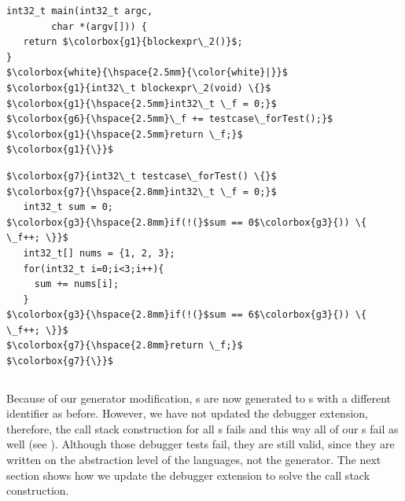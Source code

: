 \noindent
\begin{minipage}{0.50\columnwidth}
\begin{lstlisting}[language=reducedMbeddr]
int32_t main(int32_t argc,
		char *(argv[])) {
   return $\colorbox{g1}{blockexpr\_2()}$;
}  
$\colorbox{white}{\hspace{2.5mm}{\color{white}|}}$
$\colorbox{g1}{int32\_t blockexpr\_2(void) \{}$
$\colorbox{g1}{\hspace{2.5mm}int32\_t \_f = 0;}$
$\colorbox{g6}{\hspace{2.5mm}\_f += testcase\_forTest();}$
$\colorbox{g1}{\hspace{2.5mm}return \_f;}$
$\colorbox{g1}{\}}$
\end{lstlisting}  
\end{minipage}
\begin{minipage}{0.5\columnwidth}
\begin{lstlisting}[language=reducedMbeddr]
$\colorbox{g7}{int32\_t testcase\_forTest() \{}$
$\colorbox{g7}{\hspace{2.8mm}int32\_t \_f = 0;}$
   int32_t sum = 0;
$\colorbox{g3}{\hspace{2.8mm}if(!(}$sum == 0$\colorbox{g3}{)) \{ \_f++; \}}$
   int32_t[] nums = {1, 2, 3};
   for(int32_t i=0;i<3;i++){
     sum += nums[i];
   }
$\colorbox{g3}{\hspace{2.8mm}if(!(}$sum == 6$\colorbox{g3}{)) \{ \_f++; \}}$
$\colorbox{g7}{\hspace{2.8mm}return \_f;}$
$\colorbox{g7}{\}}$
\end{lstlisting}
\end{minipage}
\vspace{-4mm}
\begin{lstlisting}[caption={C code that has been generated with the modified
\ic{Testcase} generator for the example program from \lst{lst:generatedUT}},
language=mbeddr,label=lst:newGeneratedUT]
\end{lstlisting}
\vspace{-1mm}

Because of our generator modification, s are now generated to
s with a different identifier as before. However, we have not
updated the debugger extension, therefore, the call stack construction for all
s fails and this way all of our s fail as
well (see ).
Although those debugger tests fail, they are still valid, since they 
are written on the abstraction level of the languages, not the generator. The
next section shows how we update the debugger extension to solve the call stack
construction.

